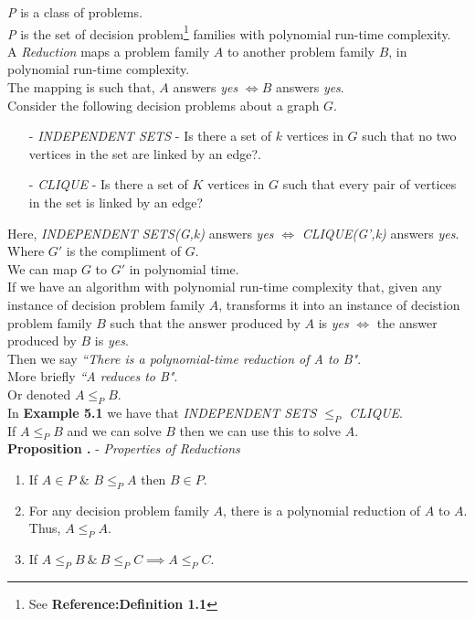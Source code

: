 \documentclass[11pt,a4paper]{article}
\begin{document}
\textit{P} is a class of problems.\\
\textit{P} is the set of decision problem\footnote{See \textbf{Reference:Definition 1.1}} families with polynomial run-time complexity.\\

A \textit{Reduction} maps a problem family $A$ to another problem family $B$, in polynomial run-time complexity.\\
 The mapping is such that, $A$ answers \textit{yes} $\Longleftrightarrow B$ answers \textit{yes}.\\

Consider the following decision problems about a graph $G$.
\begin{itemize}
	\item[-] \textit{INDEPENDENT SETS} - Is there a set of $k$ vertices in $G$ such that no two vertices in the set are linked by an edge?.
	\item[-] \textit{CLIQUE} - Is there a set of $K$ vertices in $G$ such that every pair of vertices in the set is linked by an edge?
\end{itemize} 
Here, \textit{INDEPENDENT SETS(G,k)} answers \textit{yes} $\Longleftrightarrow$ \textit{CLIQUE(G',k)} answers \textit{yes}.\\
Where $G'$ is the compliment of $G$.\\
\nb We can map $G$ to $G'$ in polynomial time.\\

If we have an algorithm with polynomial run-time complexity that, given any instance of decision problem family $A$, transforms it into an instance of decistion problem family $B$ such that the answer produced by $A$ is \textit{yes} $\Longleftrightarrow$ the answer produced by $B$ is \textit{yes}.\\
Then we say \textit{``There is a polynomial-time reduction of A to B"}.\\
More briefly \textit{``A reduces to B"}.\\
Or denoted $A\leq_PB$.\\
\nb In \textbf{Example 5.1} we have that \textit{INDEPENDENT SETS $\leq_P$ CLIQUE}.\\

If $A\leq_PB$ and we can solve $B$ then we can use this to solve $A$.\\

\textbf{Proposition .} - \textit{Properties of Reductions}
\begin{enumerate}[label=\roman*)]
	\item If $A\in P$ \& $B\leq_PA$ then $B\in P$.
	\item For any decision problem family $A$, there is a polynomial reduction of $A$ to $A$.\\
	Thus, $A\leq_PA$.
	\item If $A\leq_PB\ \&\ B\leq_PC\implies A\leq_PC$. 
\end{enumerate}
\end{document}
